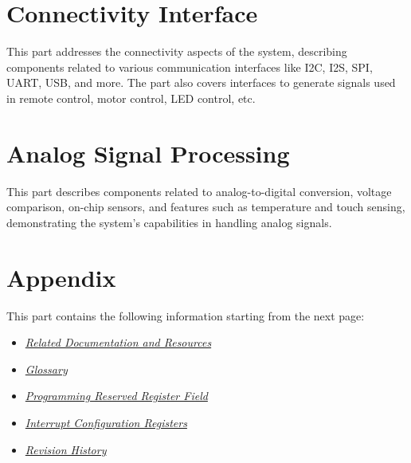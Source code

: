 \documentclass[openany, 10pt]{book}
\begin{document}
\part{Connectivity Interface}


This part addresses the connectivity aspects of the system, describing components related to various communication interfaces like I2C, I2S, SPI, UART, USB, and more. The part also covers interfaces to generate signals used in remote control, motor control, LED control, etc.







\part{Analog Signal Processing}


This part describes components related to analog-to-digital conversion, voltage comparison, on-chip sensors, and features such as temperature and touch sensing, demonstrating the system's capabilities in handling analog signals.




\part{Appendix}\label{appendix}

This part contains the following information starting from the next page:

\begin{itemize}
    \item \hyperref[sec:resources]{\textit{Related Documentation and Resources}}
    \item \hyperref[glossary]{\textit{Glossary}}
    \item \hyperref[programming-reserved-field]{\textit{Programming Reserved Register Field}}
    \item \hyperref[interrupt-config-registers]{\textit{Interrupt Configuration Registers}}
    \item \hyperref[revision-history]{\textit{Revision History}}
\end{itemize}
\end{document}
